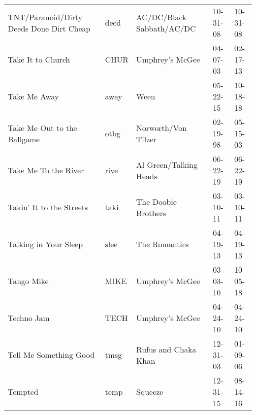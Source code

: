 \begin{longtable}{p{}p{}p{}p{}p{}}
                                TNT/Paranoid/Dirty Deeds Done Dirt Cheap &          deed &                                AC/DC/Black Sabbath/AC/DC &              10-31-08 &             10-31-08 \\
                                                       Take It to Church &          CHUR &                                          Umphrey's McGee &              04-07-03 &             02-17-13 \\
                                                            Take Me Away &          away &                                                     Ween &              05-22-15 &             10-18-18 \\
                                             Take Me Out to the Ballgame &          otbg &                                      Norworth/Von Tilzer &              02-19-98 &             05-15-03 \\
                                                    Take Me To the River &          rive &                                   Al Green/Talking Heads &              06-22-19 &             06-22-19 \\
                                                Takin' It to the Streets &          taki &                                      The Doobie Brothers &              03-10-11 &             03-10-11 \\
                                                   Talking in Your Sleep &          slee &                                            The Romantics &              04-19-13 &             04-19-13 \\
                                                              Tango Mike &          MIKE &                                          Umphrey's McGee &              03-03-10 &             10-05-18 \\
                                                              Techno Jam &          TECH &                                          Umphrey's McGee &              04-24-10 &             04-24-10 \\
                                                  Tell Me Something Good &          tmsg &                                     Rufus and Chaka Khan &              12-31-03 &             01-09-06 \\
                                                                 Tempted &          temp &                                                  Squeeze &              12-31-15 &             08-14-16 \\

\end{longtable}
